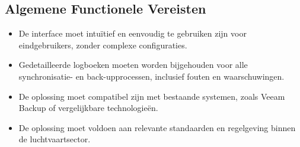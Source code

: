 \documentclass{hogent-article}
\begin{document}
    \subsection{Algemene Functionele Vereisten}
    \begin{itemize}
        \item De interface moet intuïtief en eenvoudig te gebruiken zijn voor eindgebruikers, zonder complexe configuraties.
        \item Gedetailleerde logboeken moeten worden bijgehouden voor alle synchronisatie- en back-upprocessen, inclusief fouten en waarschuwingen.
        \item De oplossing moet compatibel zijn met bestaande systemen, zoals Veeam Backup of vergelijkbare technologieën.
        \item De oplossing moet voldoen aan relevante standaarden en regelgeving binnen de luchtvaartsector.
    \end{itemize}

    
\end{document}
